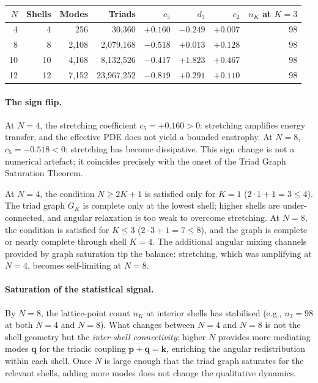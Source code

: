 \documentclass[11pt,a4paper]{article}
\theoremstyle{remark}
\begin{document}
\begin{center}
\begin{tabular}{rrrrrrrr}
\toprule
$N$ & Shells & Modes & Triads & $c_5$ & $d_3$ & $c_2$ & $n_K$ at $K\!=\!3$ \\
\midrule
4  & 4  & 256    & 30{,}360    & $+0.160$ & $-0.249$ & $+0.007$ & 98 \\
8  & 8  & 2{,}108  & 2{,}079{,}168  & $-0.518$ & $+0.013$ & $+0.128$ & 98 \\
10 & 10 & 4{,}168  & 8{,}132{,}526  & $-0.417$ & $+1.823$ & $+0.467$ & 98 \\
12 & 12 & 7{,}152  & 23{,}967{,}252 & $-0.819$ & $+0.291$ & $+0.110$ & 98  \\
\bottomrule
\end{tabular}
\end{center}

\paragraph{The sign flip.}  At $N = 4$, the stretching coefficient $c_5 = +0.160 > 0$: stretching amplifies energy transfer, and the effective PDE does not yield a bounded enstrophy.  At $N = 8$, $c_5 = -0.518 < 0$: stretching has become dissipative.  This sign change is not a numerical artefact; it coincides precisely with the onset of the Triad Graph Saturation Theorem.

At $N = 4$, the condition $N \geq 2K + 1$ is satisfied only for $K = 1$ ($2 \cdot 1 + 1 = 3 \leq 4$).  The triad graph $G_K$ is complete only at the lowest shell; higher shells are under-connected, and angular relaxation is too weak to overcome stretching.  At $N = 8$, the condition is satisfied for $K \leq 3$ ($2 \cdot 3 + 1 = 7 \leq 8$), and the graph is complete or nearly complete through shell $K = 4$.  The additional angular mixing channels provided by graph saturation tip the balance: stretching, which was amplifying at $N = 4$, becomes self-limiting at $N = 8$.

\paragraph{Saturation of the statistical signal.}  By $N = 8$, the lattice-point count $n_K$ at interior shells has stabilised (e.g., $n_3 = 98$ at both $N = 4$ and $N = 8$).  What changes between $N = 4$ and $N = 8$ is not the shell geometry but the \emph{inter-shell connectivity}: higher $N$ provides more mediating modes $\mathbf{q}$ for the triadic coupling $\mathbf{p} + \mathbf{q} = \mathbf{k}$, enriching the angular redistribution within each shell.  Once $N$ is large enough that the triad graph saturates for the relevant shells, adding more modes does not change the qualitative dynamics.
\end{document}
